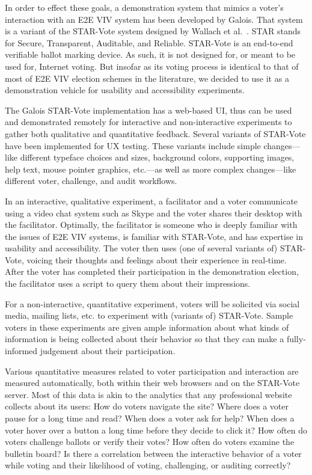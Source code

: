 In order to effect these goals, a demonstration system that mimics a
voter's interaction with an E2E VIV system has been developed by
Galois. That system is a variant of the STAR-Vote system designed by
Wallach et al.~\cite{star-vote}. STAR stands for Secure, Transparent,
Auditable, and Reliable. STAR-Vote is an end-to-end verifiable ballot
marking device. As such, it is not designed for, or meant to be used
for, Internet voting. But insofar as its voting process is identical
to that of most of E2E VIV election schemes in the literature, we
decided to use it as a demonstration vehicle for usability and
accessibility experiments.

The Galois STAR-Vote implementation has a web-based UI, thus can be
used and demonstrated remotely for interactive and non-interactive
experiments to gather both qualitative and quantitative feedback.
Several variants of STAR-Vote have been implemented for UX testing.
These variants include simple changes---like different typeface
choices and sizes, background colors, supporting images, help text,
mouse pointer graphics, etc.---as well as more complex changes---like
different voter, challenge, and audit workflows.

In an interactive, qualitative experiment, a facilitator and a voter
communicate using a video chat system such as Skype and the voter
shares their desktop with the facilitator. Optimally, the facilitator
is someone who is deeply familiar with the issues of E2E VIV systems,
is familiar with STAR-Vote, and has expertise in usability and
accessibility. The voter then uses (one of several variants of)
STAR-Vote, voicing their thoughts and feelings about their experience
in real-time. After the voter has completed their participation in the
demonstration election, the facilitator uses a script to query them
about their impressions.

For a non-interactive, quantitative experiment, voters will be
solicited via social media, mailing lists, etc. to experiment with
(variants of) STAR-Vote. Sample voters in these experiments are given
ample information about what kinds of information is being collected
about their behavior so that they can make a fully-informed judgement
about their participation.

Various quantitative measures related to voter participation and
interaction are measured automatically, both within their web browsers
and on the STAR-Vote server. Most of this data is akin to the
analytics that any professional website collects about its users: How
do voters navigate the site?  Where does a voter pause for a long time
and read?  When does a voter ask for help?  When does a voter hover
over a button a long time before they decide to click it?  How often
do voters challenge ballots or verify their votes?  How often do
voters examine the bulletin board?  Is there a correlation between the
interactive behavior of a voter while voting and their likelihood of
voting, challenging, or auditing correctly?

